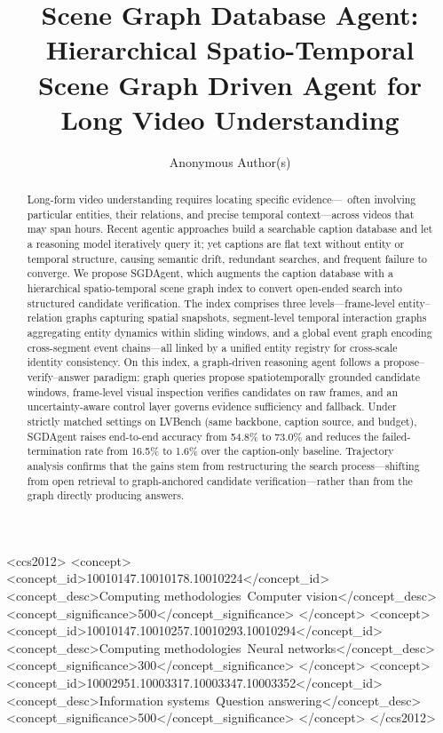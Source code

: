 \documentclass[sigconf, screen, review, anonymous]{acmart}
\begin{document}
\title{Scene Graph Database Agent: Hierarchical Spatio-Temporal Scene Graph Driven Agent for Long Video Understanding}

\author{Anonymous Author(s)}

\renewcommand{\shortauthors}{Anonymous}

\begin{abstract}

Long-form video understanding requires locating specific evidence—\ often involving particular entities, their relations, and precise temporal context—across videos that may span hours. 
Recent agentic approaches build a searchable caption database and let a reasoning model iteratively query it; yet captions are flat text without entity or temporal structure, 
causing semantic drift, redundant searches, and frequent failure to converge.
We propose SGDAgent, which augments the caption database with a hierarchical spatio-temporal scene graph index to convert open-ended search into structured candidate verification. 
The index comprises three levels—frame-level entity–relation graphs capturing spatial snapshots, segment-level temporal interaction graphs aggregating entity dynamics within sliding windows, 
and a global event graph encoding cross-segment event chains—all linked by a 
unified entity registry for cross-scale identity consistency. On this index, a graph-driven reasoning agent follows a propose–verify–answer paradigm: graph queries propose 
spatiotemporally grounded candidate windows, frame-level visual inspection verifies candidates on raw frames, and an uncertainty-aware control layer governs evidence sufficiency and fallback.
Under strictly matched settings on LVBench (same backbone, caption source, and budget), SGDAgent raises end-to-end accuracy from 54.8\% to 73.0\% and reduces the failed-termination rate from 
16.5\% to 1.6\% over the caption-only baseline. Trajectory analysis confirms that the gains stem from restructuring the search process—shifting from open retrieval to graph-anchored candidate 
verification—rather than from the graph directly producing answers.
\end{abstract}

\begin{CCSXML}
<ccs2012>
 <concept>
  <concept_id>10010147.10010178.10010224</concept_id>
  <concept_desc>Computing methodologies~Computer vision</concept_desc>
  <concept_significance>500</concept_significance>
 </concept>
 <concept>
  <concept_id>10010147.10010257.10010293.10010294</concept_id>
  <concept_desc>Computing methodologies~Neural networks</concept_desc>
  <concept_significance>300</concept_significance>
 </concept>
 <concept>
  <concept_id>10002951.10003317.10003347.10003352</concept_id>
  <concept_desc>Information systems~Question answering</concept_desc>
  <concept_significance>500</concept_significance>
 </concept>
</ccs2012>
\end{CCSXML}
\end{document}
